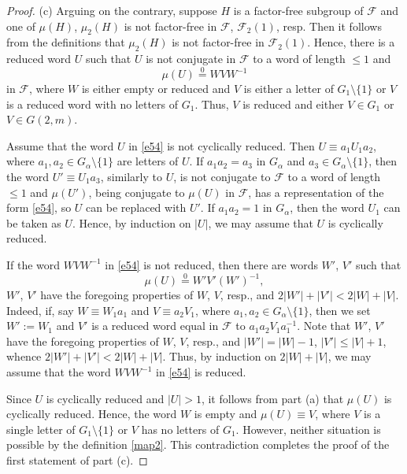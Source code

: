\documentclass[10pt, reqno]{amsart}
\numberwithin{equation}{section}
\begin{document}
\begin{proof}
(c) Arguing on the contrary, suppose $H$ is a factor-free subgroup of ${\mathcal{F}}$ and one of $\mu(H)$, $\mu_2(H)$ is not factor-free in ${\mathcal{F}}$, ${\mathcal{F}}_2(1)$, resp.  Then it follows from the definitions that  $\mu_2(H)$ is not factor-free in ${\mathcal{F}}_2(1)$. Hence, there is a reduced word $U$
such that $U$ is not conjugate in ${\mathcal{F}}$ to a word of length $\le 1$ and
\begin{equation}\label{e54}
    \mu(U) \overset 0 = WVW^{-1}
\end{equation}
in ${\mathcal{F}}$, where $W$ is either empty or reduced and $V$ is either a letter of $G_1 \setminus \{ 1\}$ or $V$ is
a reduced word with no letters of $G_1$. Thus, $V$ is reduced and either $V \in G_1$ or $V \in G(2,m)$.

Assume that the word $U$ in \eqref{e54} is not cyclically reduced. Then $U \equiv a_1 U_1 a_2$, where $a_1, a_2 \in G_{\alpha} \setminus \{ 1\}$ are letters of $U$. If $a_1 a_2 = a_3$ in $G_{\alpha}$   and $a_3 \in G_{\alpha} \setminus \{ 1\}$, then the word $U' \equiv U_1 a_3$, similarly to $U$, is not conjugate to ${\mathcal{F}}$ to a word of length $\le 1$ and $\mu(U')$, being conjugate to $\mu(U)$ in ${\mathcal{F}}$, has a representation of the form \eqref{e54}, so $U$ can be replaced with
$U'$.  If $a_1 a_2 = 1$ in $G_{\alpha}$, then the word $U_1$ can be taken as $U$. Hence, by induction on $|U|$, we may assume that $U$ is cyclically reduced.

If the word  $WVW^{-1}$  in \eqref{e54} is not reduced, then there are words $W'$, $V'$ such that
$$
\mu(U) \overset 0 = W' V' (W')^{-1} ,
$$
$W'$, $V'$ have the foregoing properties of $W$, $V$, resp., and $2|W'| + |V'| < 2|W| + |V|$. Indeed, if, say
$W \equiv W_1 a_1$ and $V \equiv a_2 V_1$, where $a_1, a_2 \in G_{\alpha} \setminus \{ 1\}$, then we set $W' := W_1$ and $V'$ is a reduced word equal in ${\mathcal{F}}$  to $a_1 a_2 V_1 a_1^{-1}$. Note that $W'$, $V'$ have the foregoing properties of $W$, $V$, resp., and   $|W'| =|W|-1$,   $|V'| \le |V|+1$, whence  $2|W'| + |V'| < 2|W| + |V|$. Thus, by induction on
$2|W| + |V|$, we may assume that the word $W V W^{-1}$ in \eqref{e54} is  reduced.

Since $U$ is cyclically reduced and $|U| >1$, it follows from part (a) that $\mu(U)$ is cyclically reduced. Hence, the word $W$ is empty and  $\mu(U) \equiv V$, where $V$ is a single letter of $G_1 \setminus \{ 1\}$ or $V$ has no letters of $G_1$. However, neither situation is possible by the definition  \eqref{map2}. This contradiction completes the proof of the first statement of part (c).


\end{proof}
\end{document}
